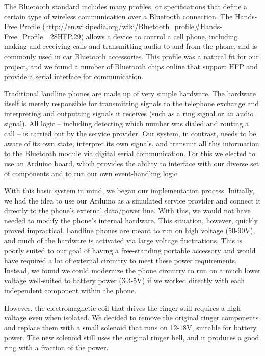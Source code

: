 \documentclass{es50report}
\begin{document}
        The Bluetooth standard includes many profiles, or specifications that define a certain type of wireless communication over a Bluetooth connection. The Hands-Free Profile (\url{http://en.wikipedia.org/wiki/Bluetooth_profile#Hands-Free_Profile_.28HFP.29}) allows a device to control a cell phone, including making and receiving calls and transmitting audio to and from the phone, and is commonly used in car Bluetooth accessories. This profile was a natural fit for our project, and we found a number of Bluetooth chips online that support HFP and provide a serial interface for communication.
        
        Traditional landline phones are made up of very simple hardware. The hardware itself is merely responsible for transmitting signals to the telephone exchange and interpreting and outputting signals it receives (such as a ring signal or an audio signal). All logic -- including detecting which number was dialed and routing a call -- is carried out by the service provider. Our system, in contrast, needs to be aware of its own state, interpret its own signals, and transmit all this information to the Bluetooth module via digital serial communication. For this we elected to use an Arduino board, which provides the ability to interface with our diverse set of components and to run our own event-handling logic.

        With this basic system in mind, we began our implementation process. Initially, we had the idea to use our Arduino as a simulated service provider and connect it directly to the phone's external data/power line. With this, we would not have needed to modify the phone's internal hardware. This situation, however, quickly proved impractical. Landline phones are meant to run on high voltage (50-90V), and much of the hardware is activated via large voltage fluctuations. This is poorly suited to our goal of having a free-standing portable accessory and would have required a lot of external circuitry to meet these power requirements. Instead, we found we could modernize the phone circuitry to run on a much lower voltage well-suited to battery power (3.3-5V) if we worked directly with each independent component within the phone.

        However, the electromagnetic coil that drives the ringer still requires a high voltage even when isolated. We decided to remove the original ringer components and replace them with a small solenoid that runs on 12-18V, suitable for battery power. The new solenoid still uses the original ringer bell, and it produces a good ring with a fraction of the power.
\end{document}
